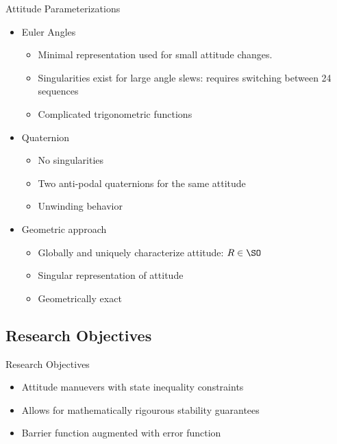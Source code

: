 \documentclass[11pt,professionalfonts]{beamer}
\begin{document}
\begin{frame}{Attitude Parameterizations}
	\begin{itemize}
		\item Euler Angles
		\begin{itemize}
			\item Minimal representation used for small attitude changes.
			\item Singularities exist for large angle slews: requires switching between 24 sequences
			\item Complicated trigonometric functions
		\end{itemize}
		\pause
		\item Quaternion 
		\begin{itemize}
			\item No singularities
			\item Two anti-podal quaternions for the same attitude
			\item Unwinding behavior 
		\end{itemize}
		\pause
		\item Geometric approach
		\begin{itemize}
			\item Globally and uniquely characterize attitude: \( R \in \SO \)
			\item Singular representation of attitude 
			\item Geometrically exact
		\end{itemize}
	\end{itemize}
	
\end{frame}

\subsection{Research Objectives}

\begin{frame}{Research Objectives}
\begin{itemize}
	\item Attitude manuevers with state inequality constraints
	\item Allows for mathematically rigourous stability guarantees
	\item Barrier function augmented with error function
\end{itemize}
\end{frame}
\end{document}
